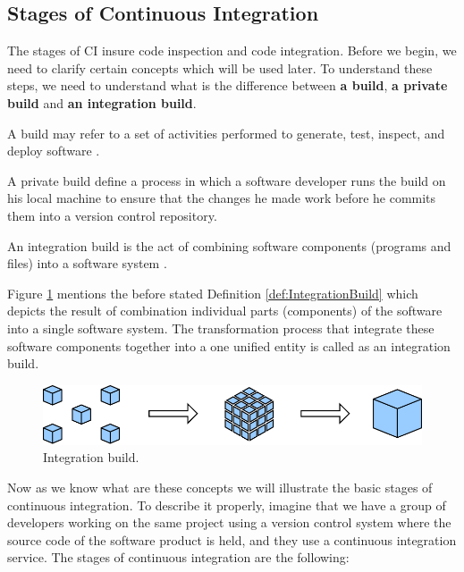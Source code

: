 \subsection{Stages of Continuous Integration}

The stages of CI insure code inspection and code integration. Before we begin, we need to clarify certain concepts which will be used later. To understand these steps, we need to understand what is the difference between \textbf{a build}, \textbf{a private build} and \textbf{an integration build}.

\begin{DEF}
A build may refer to a set of activities performed to generate, test, inspect, and deploy software \cite{CIbook}.
\end{DEF}

\begin{DEF}
A private build define a process in which a software developer runs the build on his local machine to ensure that the changes he made work before he commits them into a version control repository.
\end{DEF}

\begin{DEF}\label{def:IntegrationBuild}
An integration build is the act of combining software components (programs and files) into a software system \cite{CIbook}.
\end{DEF}

Figure \ref{fig:IntegrationBuild} mentions the before stated Definition \ref{def:IntegrationBuild} which depicts the result of combination individual parts (components) of the software into a single software system. The transformation process that integrate these software components together into a one unified entity is called as an integration build.

\begin{figure}[H]
    \centering
    \includegraphics[scale=1]{img/system_integration.pdf}
    \caption{Integration build.}
    \label{fig:IntegrationBuild}
\end{figure}


Now as we know what are these concepts we will illustrate the basic stages of continuous integration. To describe it properly, imagine that we have a group of developers working on the same project using a version control system where the source code of the software product is held, and they use a continuous integration service. The stages of continuous integration are the following:

